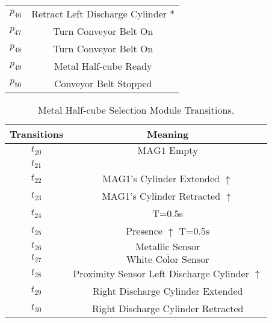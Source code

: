 \begin{table}[htbp]
\begin{tabular}{cc}
\hyperlink{partialNet:p46}{\hypertarget{partialTable:p46}{$p_{46}$}} & Retract Left Discharge Cylinder *\\
\hyperlink{partialNet:p47}{\hypertarget{partialTable:p47}{$p_{47}$}} & Turn Conveyor Belt On\\
\hyperlink{partialNet:p48}{\hypertarget{partialTable:p48}{$p_{48}$}} & Turn Conveyor Belt On\\
\hyperlink{partialNet:p49}{\hypertarget{partialTable:p49}{$p_{49}$}} & Metal Half-cube Ready\\
\hyperlink{partialNet:p50}{\hypertarget{partialTable:p50}{$p_{50}$}} & Conveyor Belt Stopped\\
\end{tabular}
\end{table}

\begin{table}[htbp]
\caption{Metal Half-cube Selection Module Transitions.}
\centering
\begin{tabular}{cc}
Transitions & Meaning\\
\hline
\hyperlink{partialNet:t20}{\hypertarget{partialTable:t20}{$t_{20}$}} & \(\overline{\mbox{MAG1 Empty}}\)\\
\hyperlink{partialNet:t21}{\hypertarget{partialTable:t21}{$t_{21}$}} & \\
\hyperlink{partialNet:t22}{\hypertarget{partialTable:t22}{$t_{22}$}} & MAG1's Cylinder Extended \(\uparrow\)\\
\hyperlink{partialNet:t23}{\hypertarget{partialTable:t23}{$t_{23}$}} & MAG1's Cylinder Retracted \(\uparrow\)\\
\hyperlink{partialNet:tt24}{\hypertarget{partialTable:tt24}{$t_{24}$}} & T=0.5s\\
\hyperlink{partialNet:tt25}{\hypertarget{partialTable:tt25}{$t_{25}$}} & Presence \(\uparrow\) T=0.5s\\
\hyperlink{partialNet:t26}{\hypertarget{partialTable:t26}{$t_{26}$}} & \(\overline{\mbox{Metallic Sensor}}\)\\
\hyperlink{partialNet:t27}{\hypertarget{partialTable:t27}{$t_{27}$}} & \(\overline{\mbox{White Color Sensor}}\)\\
\hyperlink{partialNet:t28}{\hypertarget{partialTable:t28}{$t_{28}$}} & Proximity Sensor Left Discharge Cylinder \(\uparrow\)\\
\hyperlink{partialNet:t29}{\hypertarget{partialTable:t29}{$t_{29}$}} & Right Discharge Cylinder Extended\\
\hyperlink{partialNet:t30}{\hypertarget{partialTable:t30}{$t_{30}$}} & Right Discharge Cylinder Retracted\\

\end{tabular}
\end{table}
